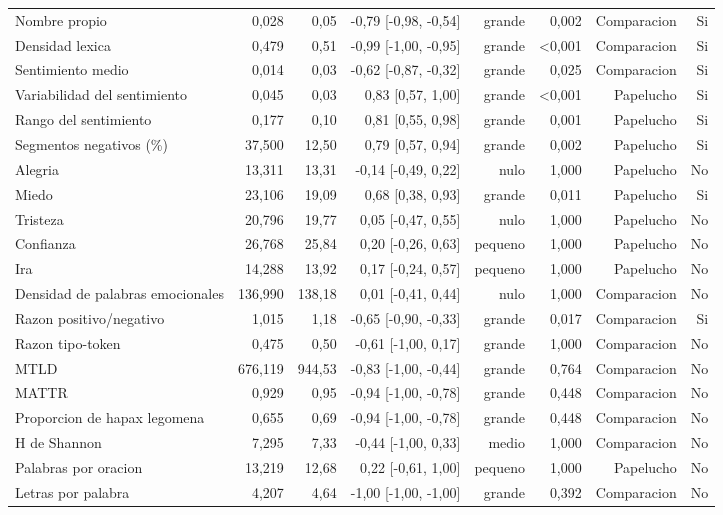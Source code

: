 \begin{table}[htbp]
\begin{tabular}{lrrrrrrr}
Nombre propio & 0,028 & 0,05 & -0,79 [-0,98, -0,54] & grande & 0,002 & Comparacion & Si \\
Densidad lexica & 0,479 & 0,51 & -0,99 [-1,00, -0,95] & grande & <0,001 & Comparacion & Si \\
Sentimiento medio & 0,014 & 0,03 & -0,62 [-0,87, -0,32] & grande & 0,025 & Comparacion & Si \\
Variabilidad del sentimiento & 0,045 & 0,03 & 0,83 [0,57, 1,00] & grande & <0,001 & Papelucho & Si \\
Rango del sentimiento & 0,177 & 0,10 & 0,81 [0,55, 0,98] & grande & 0,001 & Papelucho & Si \\
Segmentos negativos (\%) & 37,500 & 12,50 & 0,79 [0,57, 0,94] & grande & 0,002 & Papelucho & Si \\
Alegria & 13,311 & 13,31 & -0,14 [-0,49, 0,22] & nulo & 1,000 & Papelucho & No \\
Miedo & 23,106 & 19,09 & 0,68 [0,38, 0,93] & grande & 0,011 & Papelucho & Si \\
Tristeza & 20,796 & 19,77 & 0,05 [-0,47, 0,55] & nulo & 1,000 & Papelucho & No \\
Confianza & 26,768 & 25,84 & 0,20 [-0,26, 0,63] & pequeno & 1,000 & Papelucho & No \\
Ira & 14,288 & 13,92 & 0,17 [-0,24, 0,57] & pequeno & 1,000 & Papelucho & No \\
Densidad de palabras emocionales & 136,990 & 138,18 & 0,01 [-0,41, 0,44] & nulo & 1,000 & Comparacion & No \\
Razon positivo/negativo & 1,015 & 1,18 & -0,65 [-0,90, -0,33] & grande & 0,017 & Comparacion & Si \\
Razon tipo-token & 0,475 & 0,50 & -0,61 [-1,00, 0,17] & grande & 1,000 & Comparacion & No \\
MTLD & 676,119 & 944,53 & -0,83 [-1,00, -0,44] & grande & 0,764 & Comparacion & No \\
MATTR & 0,929 & 0,95 & -0,94 [-1,00, -0,78] & grande & 0,448 & Comparacion & No \\
Proporcion de hapax legomena & 0,655 & 0,69 & -0,94 [-1,00, -0,78] & grande & 0,448 & Comparacion & No \\
H de Shannon & 7,295 & 7,33 & -0,44 [-1,00, 0,33] & medio & 1,000 & Comparacion & No \\
Palabras por oracion & 13,219 & 12,68 & 0,22 [-0,61, 1,00] & pequeno & 1,000 & Papelucho & No \\
Letras por palabra & 4,207 & 4,64 & -1,00 [-1,00, -1,00] & grande & 0,392 & Comparacion & No \\

\end{tabular}
\end{table}
